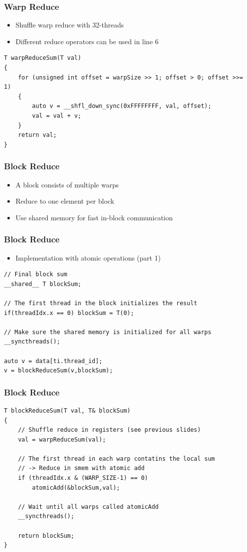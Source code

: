 \documentclass[aspectratio=169,handout]{beamer}
\begin{document}
\begin{frame}[fragile]
\frametitle{Warp Reduce}
\begin{itemize}
	\item Shuffle warp reduce with 32-threads
	\item Different reduce operators can be used in line 6
\end{itemize}

\begin{lstlisting}
T warpReduceSum(T val)
{
	for (unsigned int offset = warpSize >> 1; offset > 0; offset >>= 1)
	{
		auto v = __shfl_down_sync(0xFFFFFFFF, val, offset);
		val = val + v;
	}
	return val;
}
\end{lstlisting}

\end{frame}

\begin{frame}[fragile]
\frametitle{Block Reduce}
\begin{itemize}
	\item A block consists of multiple warps
	\item<2->[$\rightarrow$] Reduce to one element per block
	\item<3->[$\rightarrow$] Use shared memory for fast in-block communication
\end{itemize}


\end{frame}

\begin{frame}[fragile]
\frametitle{Block Reduce}
\begin{itemize}
	\item Implementation with atomic operations (part 1)
\end{itemize}

\begin{lstlisting}
// Final block sum
__shared__ T blockSum;

// The first thread in the block initializes the result
if(threadIdx.x == 0) blockSum = T(0);

// Make sure the shared memory is initialized for all warps
__syncthreads();

auto v = data[ti.thread_id];
v = blockReduceSum(v,blockSum);
\end{lstlisting}
\end{frame}


\begin{frame}[fragile]
\frametitle{Block Reduce}
\begin{lstlisting}
T blockReduceSum(T val, T& blockSum)
{
	// Shuffle reduce in registers (see previous slides)
	val = warpReduceSum(val);

	// The first thread in each warp contatins the local sum
	// -> Reduce in smem with atomic add
	if (threadIdx.x & (WARP_SIZE-1) == 0)
		atomicAdd(&blockSum,val);
		
	// Wait until all warps called atomicAdd
	__syncthreads();

	return blockSum;
}
\end{lstlisting}
\end{frame}
\end{document}
